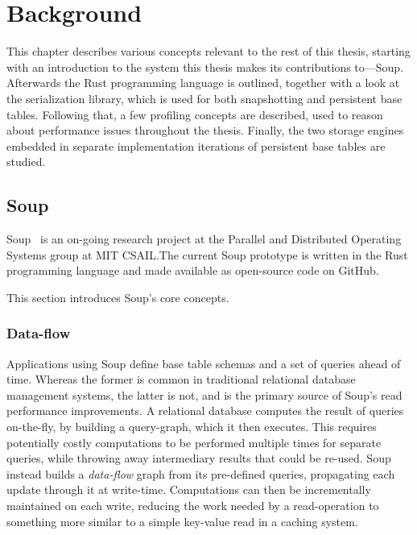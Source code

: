 \chapter{Background}\label{chap:background}

This chapter describes various concepts relevant to the rest of this thesis,
starting with an introduction to the system this thesis makes its contributions
to---Soup. Afterwards the Rust programming language is outlined, together with a
look at the  serialization library, which is used for both
snapshotting and persistent base tables. Following that, a few profiling
concepts are described, used to reason about performance issues throughout the
thesis. Finally, the two storage engines embedded in separate implementation
iterations of persistent base tables are studied.


\newpage

\section{Soup}

Soup~\cite{xylem} is an on-going research project at the Parallel and Distributed Operating
Systems group at MIT CSAIL.\@ The current Soup
prototype is written in the Rust programming language and made available as
open-source code on GitHub.

This section introduces Soup's core concepts.

\subsection{Data-flow}

Applications using Soup define base table schemas and a set of queries ahead of
time. Whereas the former is common in traditional relational database management
systems, the latter is not, and is the primary source of Soup's read performance
improvements. A relational database computes the result of queries on-the-fly,
by building a query-graph, which it then executes. This requires potentially
costly computations to be performed multiple times for separate queries, while
throwing away intermediary results that could be re-used. Soup instead builds a
\textit{data-flow} graph from its pre-defined queries, propagating each update
through it at write-time. Computations can then be incrementally maintained on
each write, reducing the work needed by a read-operation to something more
similar to a simple key-value read in a caching system.

